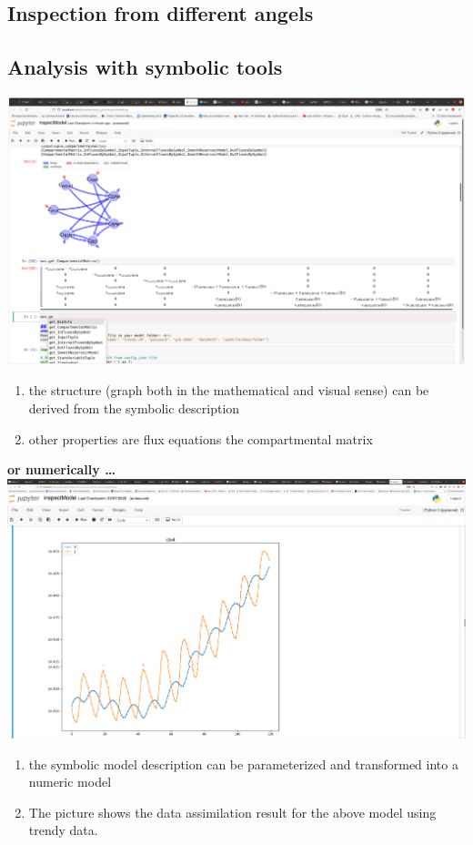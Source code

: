 \documentclass[36pt]{article}
\begin{document}
\begin{tcbposter}
{\section*{Inspection from different angels}
\subsection*{Analysis with symbolic tools}
	\includegraphics[width=\columnwidth]{mvsTabScreen.png}
	\begin{enumerate}
	\item 
	the structure (graph both in the mathematical and visual sense) can be derived from the symbolic description
	\item other properties are flux equations the compartmental matrix
	\end{enumerate}
	{\bfseries\large or numerically \dots}\\
	\includegraphics[width=.5\columnwidth]{DataAssimilation.png}
	\begin{enumerate}
	\item 
	the symbolic model description can be parameterized and transformed into a numeric model
	\item The picture shows the data assimilation result for the above model using trendy data.
	\end{enumerate}
}

\end{tcbposter}
\end{document}

